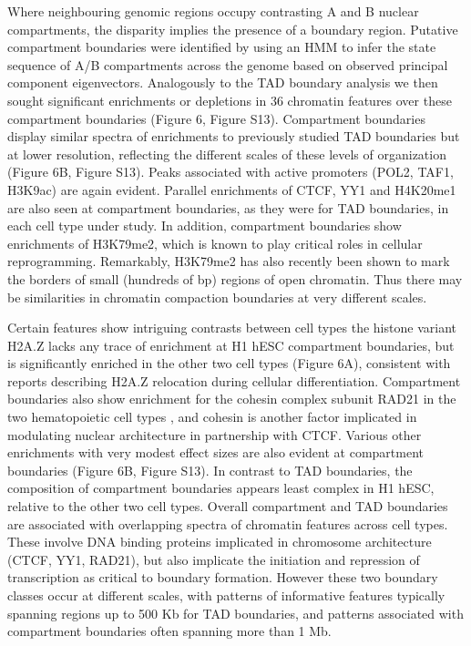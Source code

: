 \documentclass[a4paper,10pt,oneside]{book}
\begin{document}
Where neighbouring genomic regions occupy contrasting A and B nuclear
compartments, the disparity implies the presence of a boundary
region. Putative compartment boundaries were identified by using an
HMM to infer the state sequence of A/B compartments across the genome
based on observed principal component eigenvectors. Analogously to the
TAD boundary analysis we then sought significant enrichments or
depletions in 36 chromatin features over these compartment boundaries
(Figure 6, Figure S13).  Compartment boundaries display similar
spectra of enrichments to previously studied TAD boundaries
\cite{Dixon2012} but at lower resolution, reflecting the different
scales of these levels of organization (Figure 6B, Figure S13). Peaks
associated with active promoters (POL2, TAF1, H3K9ac) are again
evident. Parallel enrichments of CTCF, YY1 and H4K20me1 are also seen
at compartment boundaries, as they were for TAD boundaries, in each
cell type under study. In addition, compartment boundaries show
enrichments of H3K79me2, which is known to play critical roles in
cellular reprogramming.\cite{Onder2012} Remarkably, H3K79me2 has
also recently been shown to mark the borders of small (hundreds of bp)
regions of open chromatin.\cite{Chai2013} Thus there may be
similarities in chromatin compaction boundaries at very different
scales.

Certain features show intriguing contrasts between cell types the
histone variant H2A.Z lacks any trace of enrichment at H1 hESC
compartment boundaries, but is significantly enriched in the other two
cell types (Figure 6A), consistent with reports describing H2A.Z
relocation during cellular differentiation.\cite{Ku2012} Compartment
boundaries also show enrichment for the cohesin complex subunit RAD21
in the two hematopoietic cell types , and cohesin is
another factor implicated in modulating nuclear architecture in
partnership with CTCF.\cite{Zuin2013} Various other enrichments
with very modest effect sizes are also evident at compartment
boundaries (Figure 6B, Figure S13). In contrast to TAD boundaries, the
composition of compartment boundaries appears least complex in H1
hESC, relative to the other two cell types. Overall compartment and
TAD boundaries are associated with overlapping spectra of chromatin
features across cell types. These involve DNA binding proteins
implicated in chromosome architecture (CTCF, YY1, RAD21), but also
implicate the initiation and repression of transcription as critical
to boundary formation. However these two boundary classes occur at
different scales, with patterns of informative features typically
spanning regions up to 500 Kb for TAD boundaries, and patterns
associated with compartment boundaries often spanning more than 1 Mb.
\end{document}
